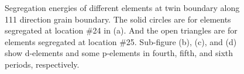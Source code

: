 \begingroup
\begin{figure}[!ht]
  \centering
\caption[Segregation energies of different elements at twin boundary along {111} direction grain boundary.]{Segregation energies of different elements at twin boundary along {111} direction grain boundary. The solid circles are for elements segregated at location \#24 in (a). And the open triangles are for elements segregated at location \#25. Sub-figure (b), (c), and (d) show d-elements and some p-elements in fourth, fifth, and sixth periods, respectively.}
\label{Chap:Ag/ZnO:fig19}
\end{figure}
\endgroup


